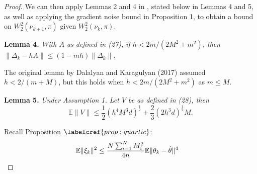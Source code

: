\begin{proof}
We can then apply Lemmas 2 and 4 in \citet{dalalyan2017}, stated below in Lemmas 4 and 5, as well as applying the gradient noise bound in Proposition 1, to obtain a bound on $W_2^2(\nu_{k+1}, \pi)$ given $W_2^2(\nu_k, \pi)$.   

\textbf{Lemma 4.} \textit{With $A$ as defined in (27), if $h < 2m/(2M^2 + m^2)$, then $\|\Delta_k - hA\| \leq (1 - mh)\|\Delta_k\|.$}

The original lemma by Dalalyan and Karagulyan (2017) assumed $h < 2/(m + M)$, but this holds when $h < 2m/(2M^2 + m^2)$ as $m \leq M$.

\textbf{Lemma 5.} \textit{Under Assumption 1. Let $V$ be as defined in (28), then}
\begin{equation}
    \mathbb{E}\|V\| \leq \frac{1}{2}(h^4 M^3 d)^{\frac{1}{2}} + \frac{2}{3}(2h^3 d)^{\frac{1}{2}}M.
\end{equation}

 Recall Proposition $\labelcref{prop:quartic}$:
\begin{align}
    \mathbb{E}\|\xi_k\|^2 &\leq \frac{N \sum_{i=1}^N M_i^2}{4n} \mathbb{E}\|\theta_k - \hat\theta\|^4 \notag
\end{align}



\end{proof}
